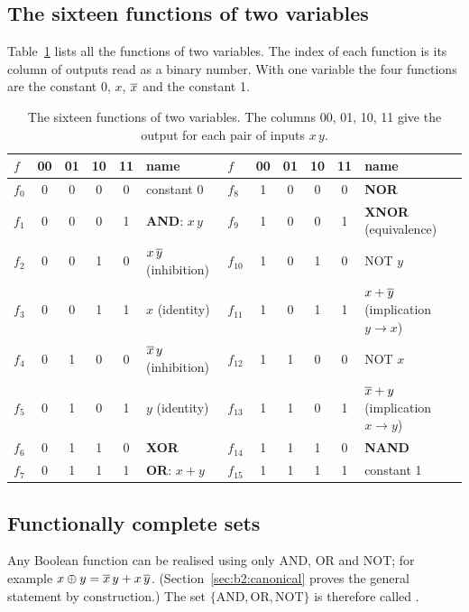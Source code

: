 \subsection{The sixteen functions of two variables}

Table~\ref{tab:b2:sixteen} lists all the functions of two variables. The
index of each function is its column of outputs read as a binary number. With
one variable the four functions are the constant 0, $x$, $\overline{x}$ and the
constant 1.

\begin{table}[htb]
\centering\small
\caption{The sixteen functions of two variables. The columns 00, 01, 10, 11
give the output for each pair of inputs $x\,y$.}\label{tab:b2:sixteen}
\begin{tabular}{@{}lccccl@{\qquad}lccccl@{}}
\toprule
$f$ & 00 & 01 & 10 & 11 & \textbf{name} & $f$ & 00 & 01 & 10 & 11 & \textbf{name}\\
\midrule
$f_0$ & 0&0&0&0 & constant 0 & $f_8$ & 1&0&0&0 & \textbf{NOR}\\
$f_1$ & 0&0&0&1 & \textbf{AND}: $x\,y$ & $f_9$ & 1&0&0&1 & \textbf{XNOR} (equivalence)\\
$f_2$ & 0&0&1&0 & $x\,\overline{y}$ (inhibition) & $f_{10}$ & 1&0&1&0 & NOT $y$\\
$f_3$ & 0&0&1&1 & $x$ (identity) & $f_{11}$ & 1&0&1&1 & $x+\overline{y}$ (implication $y\to x$)\\
$f_4$ & 0&1&0&0 & $\overline{x}\,y$ (inhibition) & $f_{12}$ & 1&1&0&0 & NOT $x$\\
$f_5$ & 0&1&0&1 & $y$ (identity) & $f_{13}$ & 1&1&0&1 & $\overline{x}+y$ (implication $x\to y$)\\
$f_6$ & 0&1&1&0 & \textbf{XOR} & $f_{14}$ & 1&1&1&0 & \textbf{NAND}\\
$f_7$ & 0&1&1&1 & \textbf{OR}: $x+y$ & $f_{15}$ & 1&1&1&1 & constant 1\\
\bottomrule
\end{tabular}
\end{table}

\subsection{Functionally complete sets}

Any Boolean function can be realised using only AND, OR and NOT; for example
$x\oplus y=\overline{x}\,y+x\,\overline{y}$. (Section~\ref{sec:b2:canonical} proves
the general statement by construction.) The set $\{\text{AND},\text{OR},
\text{NOT}\}$ is therefore called .

